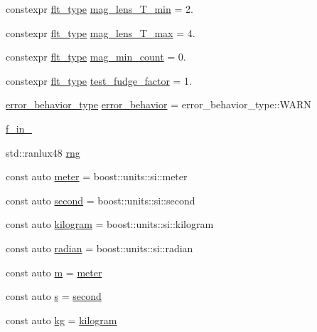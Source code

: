 \begin{DoxyCompactItemize}
\item 
constexpr \hyperlink{lib_2IceBRG__main_2common_8h_ad0f130a56eeb944d9ef2692ee881ecc4}{flt\-\_\-type} \hyperlink{namespaceIceBRG_ac8678d1f61a28341bc7157159256bb3b}{mag\-\_\-lens\-\_\-\-T\-\_\-min} = 2.
\item 
constexpr \hyperlink{lib_2IceBRG__main_2common_8h_ad0f130a56eeb944d9ef2692ee881ecc4}{flt\-\_\-type} \hyperlink{namespaceIceBRG_a2396686715e28d2b62baac2dfb9021a9}{mag\-\_\-lens\-\_\-\-T\-\_\-max} = 4.
\item 
constexpr \hyperlink{lib_2IceBRG__main_2common_8h_ad0f130a56eeb944d9ef2692ee881ecc4}{flt\-\_\-type} \hyperlink{namespaceIceBRG_a64cda385b1f9579a049d1d58d0844611}{mag\-\_\-min\-\_\-count} = 0.
\item 
constexpr \hyperlink{lib_2IceBRG__main_2common_8h_ad0f130a56eeb944d9ef2692ee881ecc4}{flt\-\_\-type} \hyperlink{namespaceIceBRG_ada4d38aafd54f8dff69cf92960cfa2a9}{test\-\_\-fudge\-\_\-factor} = 1.
\item 
\hyperlink{namespaceIceBRG_afc0a41c01ba37ad05cd3032371417832}{error\-\_\-behavior\-\_\-type} \hyperlink{namespaceIceBRG_a7c664338d0bd76bc09ed343d7478e65f}{error\-\_\-behavior} = error\-\_\-behavior\-\_\-type\-::\-W\-A\-R\-N
\item 
\hyperlink{namespaceIceBRG_adc45d5d0dcb62999139c819c97077451}{f\-\_\-in\-\_}
\item 
std\-::ranlux48 \hyperlink{namespaceIceBRG_a43349d2fe56e49b46f2da45c2472137d}{rng}
\item 
const auto \hyperlink{namespaceIceBRG_aa73b527a69b3a11b2dcb1d5c1b1d5ef1}{meter} = boost\-::units\-::si\-::meter
\item 
const auto \hyperlink{namespaceIceBRG_a542d4177a57d87415daf841cf88e6b15}{second} = boost\-::units\-::si\-::second
\item 
const auto \hyperlink{namespaceIceBRG_aaf220eb7f44e1dc31c74784c7e1ff646}{kilogram} = boost\-::units\-::si\-::kilogram
\item 
const auto \hyperlink{namespaceIceBRG_af78fec3f42ee23d596793328b8991468}{radian} = boost\-::units\-::si\-::radian
\item 
const auto \hyperlink{namespaceIceBRG_ada6365c5d16106f0608afbd34f010bcc}{m} = \hyperlink{namespaceIceBRG_aa73b527a69b3a11b2dcb1d5c1b1d5ef1}{meter}
\item 
const auto \hyperlink{namespaceIceBRG_ad0b9ada1ad5ccc9d88c2050483109e06}{s} = \hyperlink{namespaceIceBRG_a542d4177a57d87415daf841cf88e6b15}{second}
\item 
const auto \hyperlink{namespaceIceBRG_a9233960f6792ea35145d7db55c13e85d}{kg} = \hyperlink{namespaceIceBRG_aaf220eb7f44e1dc31c74784c7e1ff646}{kilogram}

\end{DoxyCompactItemize}
